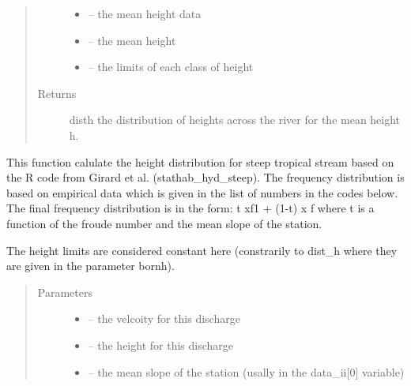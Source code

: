 \documentclass[letterpaper,10pt,english]{sphinxmanual}
\begin{document}
\begin{fulllineitems}
\begin{fulllineitems}
\begin{quote}
\begin{description}
\begin{itemize}
\item {} 
 -- the mean height data

\item {} 
 -- the mean height

\item {} 
 -- the limits of each class of height

\end{itemize}

\item[{Returns}] \leavevmode
disth the distribution of heights across the river for the mean height h.

\end{description}\end{quote}

\end{fulllineitems}


\begin{fulllineitems}
\label{\detokenize{index:src.stathab_c.Stathab.dist_h_trop}}
This function calulate the height distribution for steep tropical stream based on the R code from
Girard et al. (stathab\_hyd\_steep). The frequency distribution is based on empirical data which
is given in the list of numbers in the codes below. The final frequency distribution is in the form:
t xf1 + (1-t) x f where t is a function of the froude number and the mean slope of the station.

The height limits are considered constant here (constrarily to dist\_h where they are given in the parameter
bornh).
\begin{quote}\begin{description}
\item[{Parameters}] \leavevmode\begin{itemize}
\item {} 
 -- the velcoity for this discharge

\item {} 
 -- the height for this discharge

\item {} 
 -- the mean slope of the station (usally in the data\_ii{[}0{]} variable)


\end{itemize}
\end{description}
\end{quote}
\end{fulllineitems}
\end{fulllineitems}
\end{document}
